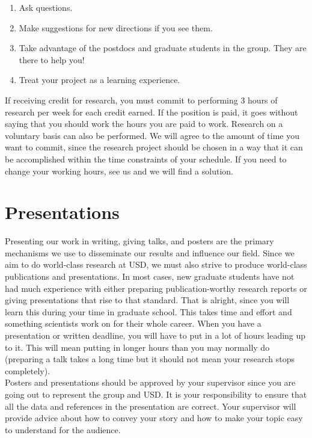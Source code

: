 \documentclass[letterpaper]{article}
\begin{document}
\begin{enumerate}
\item Ask questions.
\item Make suggestions for new directions if you see them.
\item Take advantage of the postdocs and graduate students in the group. They are there to help you! 
\item Treat your project as a learning experience.
\end{enumerate}

If receiving credit for research, you must commit to performing 3 hours of research per week for each credit earned. If the position is paid, it goes without saying that you should work the hours you are paid to work. Research on a voluntary basis can also be performed. We will agree to the amount of time you want to commit, since the research project should be chosen in a way that it can be accomplished within the time constraints of your schedule. If you need to change your working hours, see us and we will find a solution.


\section*{Presentations}
Presenting our work in writing, giving talks, and posters are the primary mechanisms we use to disseminate our results and influence our field. Since we aim to do world-class research at USD, we must also strive to produce world-class publications and presentations. In most cases, new graduate students have not had much experience with either preparing publication-worthy research reports or giving presentations that rise to that standard. That is alright, since you will learn this during your time in graduate school. This takes time and effort and something scientists work on for their whole career. When you have a presentation or written deadline, you will have to put in a lot of hours leading up to it. This will mean putting in longer hours than you may normally do (preparing a talk takes a long time but it should not mean your research stops completely).\\

Posters and presentations should be approved by your supervisor since you are going out to represent the group and USD. It is your responsibility to ensure that all the data and references in the presentation are correct. Your supervisor will provide advice about how to convey your story and how to make your topic easy to understand for the audience.
\end{document}
